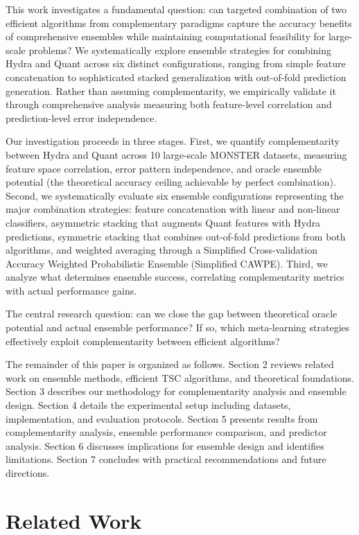 \documentclass[pdflatex,sn-basic]{sn-jnl}           %
\theoremstyle{thmstyleone}%
\theoremstyle{thmstyletwo}%
\theoremstyle{thmstylethree}%
\begin{document}
This work investigates a fundamental question: can targeted combination of two efficient algorithms from complementary paradigms capture the accuracy benefits of comprehensive ensembles while maintaining computational feasibility for large-scale problems? We systematically explore ensemble strategies for combining Hydra and Quant across six distinct configurations, ranging from simple feature concatenation to sophisticated stacked generalization with out-of-fold prediction generation. Rather than assuming complementarity, we empirically validate it through comprehensive analysis measuring both feature-level correlation and prediction-level error independence.

Our investigation proceeds in three stages. First, we quantify complementarity between Hydra and Quant across 10 large-scale MONSTER datasets, measuring feature space correlation, error pattern independence, and oracle ensemble potential (the theoretical accuracy ceiling achievable by perfect combination). Second, we systematically evaluate six ensemble configurations representing the major combination strategies: feature concatenation with linear and non-linear classifiers, asymmetric stacking that augments Quant features with Hydra predictions, symmetric stacking that combines out-of-fold predictions from both algorithms, and weighted averaging through a Simplified Cross-validation Accuracy Weighted Probabilistic Ensemble (Simplified CAWPE). Third, we analyze what determines ensemble success, correlating complementarity metrics with actual performance gains.

The central research question: can we close the gap between theoretical oracle potential and actual ensemble performance? If so, which meta-learning strategies effectively exploit complementarity between efficient algorithms?

The remainder of this paper is organized as follows. Section 2 reviews related work on ensemble methods, efficient TSC algorithms, and theoretical foundations. Section 3 describes our methodology for complementarity analysis and ensemble design. Section 4 details the experimental setup including datasets, implementation, and evaluation protocols. Section 5 presents results from complementarity analysis, ensemble performance comparison, and predictor analysis. Section 6 discusses implications for ensemble design and identifies limitations. Section 7 concludes with practical recommendations and future directions.


\section{Related Work}\label{sec2}
\end{document}
